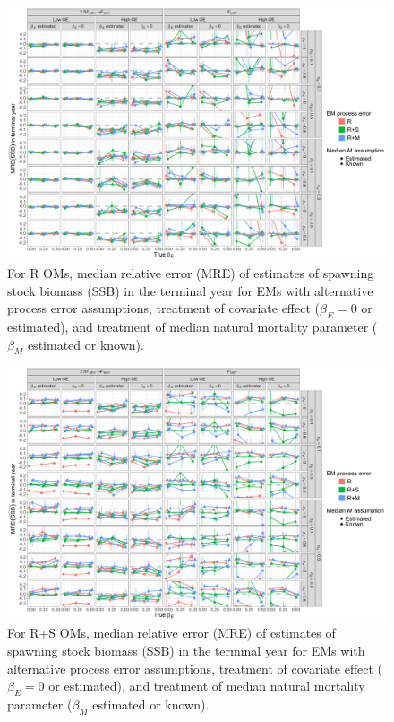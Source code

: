 \documentclass[
  12pt,
]{article}
\begin{document}
\begin{landscape}
\begin{figure}
\begin{center}
\includegraphics[height = \textheight]{terminal_year_ssb_bias_Rom}
\end{center}
\caption{For R OMs, median relative error (MRE) of estimates of spawning stock biomass (SSB) in the terminal year for EMs with alternative process error assumptions, treatment of covariate effect ($\beta_E = 0$ or estimated), and treatment of median natural mortality parameter ($\beta_M$ estimated or known).}\label{terminal_ssb_bias_Rom}
\end{figure}
\end{landscape}

\begin{landscape}
\begin{figure}
\begin{center}
\includegraphics[height = \textheight]{terminal_year_ssb_bias_RSom}
\end{center}
\caption{For R+S OMs, median relative error (MRE) of estimates of spawning stock biomass (SSB) in the terminal year for EMs with alternative process error assumptions, treatment of covariate effect ($\beta_E = 0$ or estimated), and treatment of median natural mortality parameter ($\beta_M$ estimated or known).}\label{terminal_ssb_bias_RSom}
\end{figure}
\end{landscape}
\end{document}
